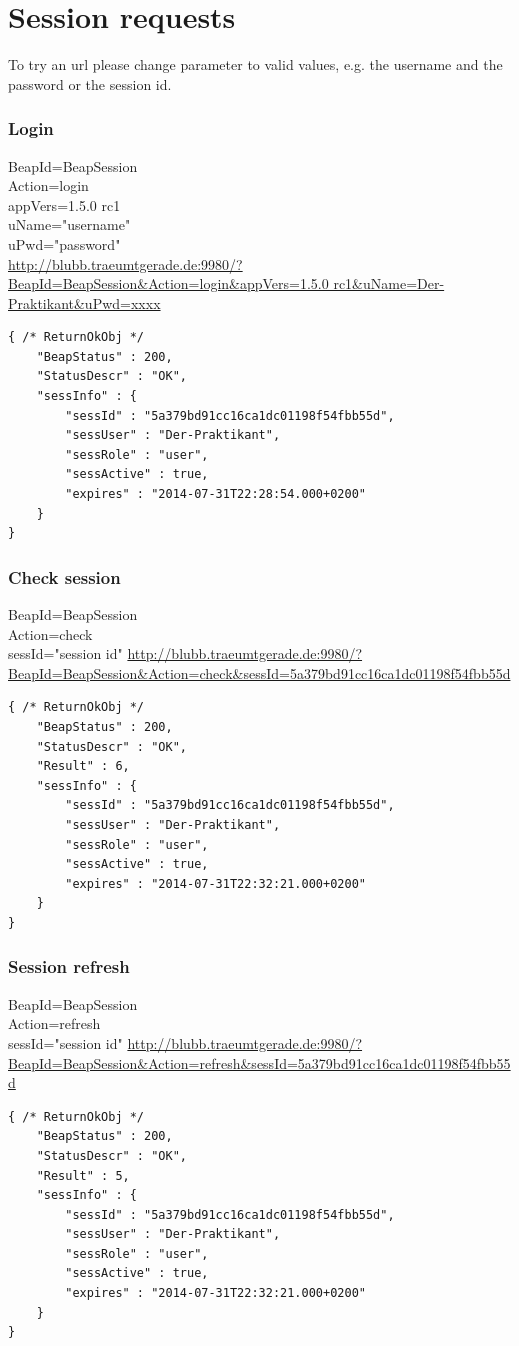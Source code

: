 \documentclass[12pt,a4paper,oneside]{report}
\begin{document}
\section{Session requests}
To try an url please change parameter to valid values, e.g. the username and the password or the session id.
\subsubsection{Login}
BeapId=BeapSession\\
Action=login\\
appVers=1.5.0 rc1\\
uName="username"\\
uPwd="password"\\
\url{http://blubb.traeumtgerade.de:9980/?BeapId=BeapSession&Action=login&appVers=1.5.0 rc1&uName=Der-Praktikant&uPwd=xxxx}
\lstset{language=JavaScript}
\begin{lstlisting}
{ /* ReturnOkObj */
    "BeapStatus" : 200,
    "StatusDescr" : "OK",
    "sessInfo" : { 
        "sessId" : "5a379bd91cc16ca1dc01198f54fbb55d",
        "sessUser" : "Der-Praktikant",
        "sessRole" : "user",
        "sessActive" : true,
        "expires" : "2014-07-31T22:28:54.000+0200"
    }
}
\end{lstlisting}
\clearpage
\subsubsection{Check session}
BeapId=BeapSession\\
Action=check\\
sessId="session id"
\url{http://blubb.traeumtgerade.de:9980/?BeapId=BeapSession&Action=check&sessId=5a379bd91cc16ca1dc01198f54fbb55d}
\lstset{language=JavaScript}
\begin{lstlisting}
{ /* ReturnOkObj */
    "BeapStatus" : 200,
    "StatusDescr" : "OK",
    "Result" : 6,
    "sessInfo" : { 
        "sessId" : "5a379bd91cc16ca1dc01198f54fbb55d",
        "sessUser" : "Der-Praktikant",
        "sessRole" : "user",
        "sessActive" : true,
        "expires" : "2014-07-31T22:32:21.000+0200"
    }
}
\end{lstlisting}

\subsubsection{Session refresh}

BeapId=BeapSession\\
Action=refresh\\
sessId="session id"
\url{http://blubb.traeumtgerade.de:9980/?BeapId=BeapSession&Action=refresh&sessId=5a379bd91cc16ca1dc01198f54fbb55d}
\lstset{language=JavaScript}
\begin{lstlisting}
{ /* ReturnOkObj */
    "BeapStatus" : 200,
    "StatusDescr" : "OK",
    "Result" : 5,
    "sessInfo" : { 
        "sessId" : "5a379bd91cc16ca1dc01198f54fbb55d",
        "sessUser" : "Der-Praktikant",
        "sessRole" : "user",
        "sessActive" : true,
        "expires" : "2014-07-31T22:32:21.000+0200"
    }
}
\end{lstlisting}
\end{document}
